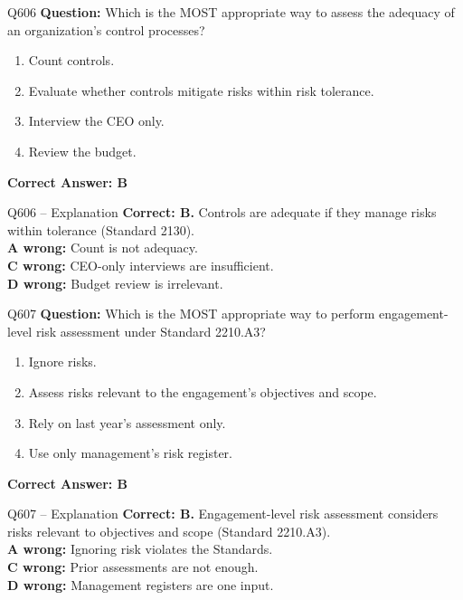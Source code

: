 \documentclass[aspectratio=169,10pt]{beamer}
\begin{document}
	\begin{frame}[t]{Q606}
		\small
		\textbf{Question:} Which is the MOST appropriate way to assess the adequacy of an organization's control processes?
		\begin{enumerate}[label=\Alph*.,itemsep=1pt,topsep=2pt]
			\item Count controls.
			\item Evaluate whether controls mitigate risks within risk tolerance.
			\item Interview the CEO only.
			\item Review the budget.
		\end{enumerate}
		\vspace{4pt}
		\textbf{Correct Answer: B}
	\end{frame}
	
	\begin{frame}[t]{Q606 -- Explanation}
		\small
		\textbf{Correct: B.} Controls are adequate if they manage risks within tolerance (Standard 2130). \\[4pt]
		\textbf{A wrong:} Count is not adequacy. \\[2pt]
		\textbf{C wrong:} CEO-only interviews are insufficient. \\[2pt]
		\textbf{D wrong:} Budget review is irrelevant.
	\end{frame}
	
	\begin{frame}[t]{Q607}
		\small
		\textbf{Question:} Which is the MOST appropriate way to perform engagement-level risk assessment under Standard 2210.A3?
		\begin{enumerate}[label=\Alph*.,itemsep=1pt,topsep=2pt]
			\item Ignore risks.
			\item Assess risks relevant to the engagement's objectives and scope.
			\item Rely on last year's assessment only.
			\item Use only management's risk register.
		\end{enumerate}
		\vspace{4pt}
		\textbf{Correct Answer: B}
	\end{frame}
	
	\begin{frame}[t]{Q607 -- Explanation}
		\small
		\textbf{Correct: B.} Engagement-level risk assessment considers risks relevant to objectives and scope (Standard 2210.A3). \\[4pt]
		\textbf{A wrong:} Ignoring risk violates the Standards. \\[2pt]
		\textbf{C wrong:} Prior assessments are not enough. \\[2pt]
		\textbf{D wrong:} Management registers are one input.
	\end{frame}
	
\end{document}
